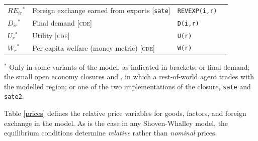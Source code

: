 \begin{table}[t!]
\begin{center}
\begin{tabular}{l>{\raggedright\arraybackslash}p{5.6cm}ll}
$\mathit{RE}_{ir}$$^*$ & Foreign exchange earned from exports [\texttt{sate}] & \texttt{REVEXP(i,r)} & \\
$D_{ir}$$^*$ & Final demand [\textsc{cde}] & \texttt{D(i,r)} & \\
$U_r$$^*$ & Utility [\textsc{cde}] & \texttt{U(r)} & \\
$W_r$$^*$ & Per capita welfare (money metric) [\textsc{cde}] & \texttt{W(r)} & \\
\bottomrule
\end{tabular}
\par\smallskip
\begin{minipage}{\textwidth}\footnotesize
$^*$ Only in some variants of the model, as indicated in brackets:
\LES or \CDE final demand; the small open economy closures \SOE and \SATE, in which a rest-of-world agent trades with the modelled region; or one of the two implementations of the \SATE closure, \texttt{sate} and \texttt{sate2}.
\end{minipage}
\end{center}
\end{table}

Table \ref{prices} defines the relative price variables for goods,
factors, and foreign exchange in the model. As is the case in any Shoven-Whalley \CGE model,
the equilibrium conditions determine \textit{relative} rather than
\textit{nominal} prices.

